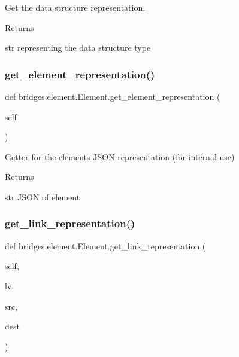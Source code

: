 Get the data structure representation. 

\begin{DoxyReturn}{Returns}


str representing the data structure type 
\end{DoxyReturn}
\mbox{\label{classbridges_1_1element_1_1_element_a511fbc6323616d806ae0ae33010f4654}} 
\subsubsection{\texorpdfstring{get\+\_\+element\+\_\+representation()}{get\_element\_representation()}}
{\footnotesize\ttfamily def bridges.\+element.\+Element.\+get\+\_\+element\+\_\+representation (\begin{DoxyParamCaption}\item[{}]{self }\end{DoxyParamCaption})}



Getter for the element\textquotesingle{}s J\+S\+ON representation (for internal use) 

\begin{DoxyReturn}{Returns}


str J\+S\+ON of element 
\end{DoxyReturn}
\mbox{\label{classbridges_1_1element_1_1_element_a8f220d7b81c0e0dd84b9eff33ade76b9}} 
\subsubsection{\texorpdfstring{get\+\_\+link\+\_\+representation()}{get\_link\_representation()}}
{\footnotesize\ttfamily def bridges.\+element.\+Element.\+get\+\_\+link\+\_\+representation (\begin{DoxyParamCaption}\item[{}]{self,  }\item[{}]{lv,  }\item[{}]{src,  }\item[{}]{dest }\end{DoxyParamCaption})}




